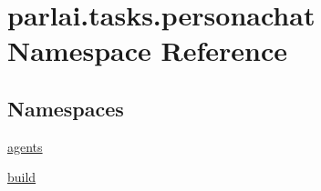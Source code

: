 \hypertarget{namespaceparlai_1_1tasks_1_1personachat}{}\section{parlai.\+tasks.\+personachat Namespace Reference}
\label{namespaceparlai_1_1tasks_1_1personachat}
\subsection*{Namespaces}
\begin{DoxyCompactItemize}
\item 
 \hyperlink{namespaceparlai_1_1tasks_1_1personachat_1_1agents}{agents}
\item 
 \hyperlink{namespaceparlai_1_1tasks_1_1personachat_1_1build}{build}
\end{DoxyCompactItemize}
